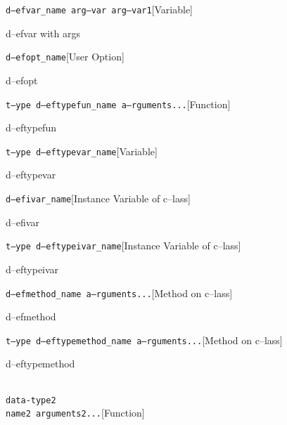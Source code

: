 \documentclass{book}
\begin{document}
\noindent\texttt\bgroup{}d--efvar\_name arg--var arg--var1\egroup{}\hfill[Variable]



%
d--efvar with args

\noindent\texttt\bgroup{}d--efopt\_name\egroup{}\hfill[User Option]



%
d--efopt

\noindent\texttt\bgroup{}t--ype d--eftypefun\_name a--rguments...\egroup{}\hfill[Function]



%
d--eftypefun

\noindent\texttt\bgroup{}t--ype d--eftypevar\_name\egroup{}\hfill[Variable]



%
d--eftypevar

\noindent\texttt\bgroup{}d--efivar\_name\egroup{}\hfill[Instance Variable of c--lass]



%
d--efivar

\noindent\texttt\bgroup{}t--ype d--eftypeivar\_name\egroup{}\hfill[Instance Variable of c--lass]



%
d--eftypeivar

\noindent\texttt\bgroup{}d--efmethod\_name a--rguments...\egroup{}\hfill[Method on c--lass]



%
d--efmethod

\noindent\texttt\bgroup{}t--ype d--eftypemethod\_name a--rguments...\egroup{}\hfill[Method on c--lass]



%
d--eftypemethod


\noindent\texttt\bgroup{}\leavevmode{}\\data-type2\leavevmode{}\\name2 arguments2...\egroup{}\hfill[Function]
\end{document}
